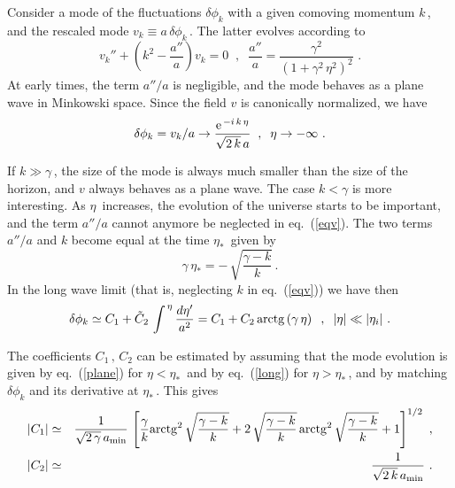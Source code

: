 \documentclass[a4paper,11pt]{article}
\begin{document}
Consider a mode of the fluctuations $\delta \phi_k$ with a given comoving
momentum $k\,$, and the rescaled mode $v_k \equiv a \, \delta \phi_k \,$.
The latter evolves according to
%
\begin{equation}
v_k'' + \left( k^2 - \frac{a''}{a} \right) v_k = 0 \;\;,\;\; \frac{a''}{a} = \frac{\gamma^2}{\left( 1 + \gamma^2 \, \eta^2 \right)^2} \,\,.
\label{eqv}
\end{equation}
%
At early times, the term $a''/a$ is negligible, and the mode behaves as a plane wave in Minkowski space. Since the field $v$ is canonically normalized, we have
%
\begin{equation}
\delta \phi_k = v_k/a \rightarrow \frac{{\rm e}^{\,-i\,k\,\eta}}{\sqrt{2 \,k} \, a} \;\;,\;\; \eta \rightarrow - \infty \,\,.
\label{plane}
\end{equation}

If $k \gg \gamma\,$, the size of the mode is always much smaller than the 
size of the horizon, and $v$ always behaves as a plane wave. The case $k < \gamma$ is more interesting. As $\eta\,$ increases, the evolution of the universe starts to be important, and the term $a''/a$ cannot anymore be neglected in eq.~(\ref{eqv}). The two terms $a''/a$ and $k$ become equal at the time $\eta_*\,$ given by
%
\begin{equation}
\gamma \, \eta_* = - \, \sqrt{\frac{\gamma - k}{k}} \,.
\label{etastar}
\end{equation}
%
In the long wave limit (that is, neglecting $k$ in eq.~(\ref{eqv})) we have then 
%
\begin{equation}
\delta \phi_k \simeq C_1 + {\tilde C}_2 \, \int^{\,\eta} \frac{d \eta'}{a^2} = C_1 + C_2 \, {\rm arctg } \left( \gamma \, \eta \right)
\;\;,\;\; \vert \eta \vert \ll \vert \eta_i \vert \,\,.
\label{long}
\end{equation}

The coefficients $C_1 \,,\, C_2$ can be estimated by assuming that the
mode evolution is given by eq.~(\ref{plane}) for $\eta < \eta_*\,$ and by
eq.~(\ref{long}) for $\eta > \eta_*\,$, and by matching $\delta \phi_k$
and its derivative at $\eta_*\,$. This gives
%
\begin{eqnarray}
\vert C_1\vert &\simeq& \frac{1}{\sqrt{2 \, \gamma}\,a_{\rm min}} \, \left[ \frac{\gamma}{k} {\rm arctg}^2 \,
\sqrt{\frac{\gamma - k}{k}} + 2 \, \sqrt{\frac{\gamma - k}{k}} \, {\rm arctg}^2 \,
\sqrt{\frac{\gamma - k}{k}} + 1 \right]^{1/2} \,\,, \nonumber\\
\vert C_2 \vert &\simeq& \frac{1}{\sqrt{2 \, k}\,a_{\rm min}} \,\,.
\label{c1c2}
\end{eqnarray}
%
\end{document}
